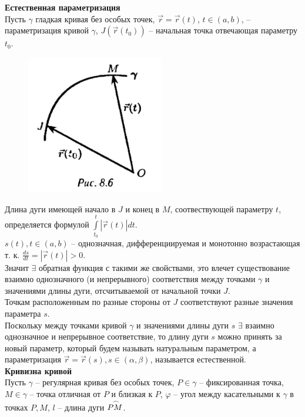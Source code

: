 \documentclass{report}
\begin{document}
\newpage
\noindent
\textbf{Естественная параметризация}\\
Пусть $\gamma$ гладкая кривая без особых точек, $\overrightarrow{r} = \overrightarrow{r}(t)$,
$t \in (a, b)$, -- параметризация кривой $\gamma$, $J(\overrightarrow{r}(t_0))$ -- начальная
точка отвечающая параметру $t_0$.\\

\begin{figure}[ht!]
\centering
\includegraphics[width=60mm]{curve5.png}
\end{figure}

\noindent
Длина дуги имеющей начало в $J$ и конец в $M$, соотвествующей параметру $t$, определяется 
формулой $\int\limits_{t_0}^{t} |\overrightarrow{r}(t)| dt$.\\
$s(t), t \in (a, b)$ -- однозначная, дифференциируемая и монотонно возрастающая т. к. 
$\frac{ds}{dt} = |\overrightarrow{r}(t)| > 0$.\\
Значит $\exists$ обратная функция с такими же свойствами, это влечет существование 
взаимно однозначного (и непрерывного) соответствия между точками $\gamma$ и значениями длины
дуги, отсчитываемой от начальной точки $J$.\\
Точкам расположенным по разные стороны от $J$ соответствуют разные значения параметра $s$.\\
Поскольку между точками кривой $\gamma$ и значениями длины дуги $s$ $\exists$ 
взаимно однозначное и непрерывное соответствие, то длину дуги $s$ можно принять за новый
параметр, который будем называть натуральным параметром, а параметризация 
$\overrightarrow{r} = \overrightarrow{r}(s), s \in (\alpha, \beta)$, называется естественной.\\

\noindent
\textbf{Кривизна кривой}\\
Пусть $\gamma$ -- регулярная кривая без особых точек, $P \in \gamma$ -- фиксированная точка, 
$M \in \gamma$ -- точка отличная от $P$ и близкая к $P$, $\varphi$ -- угол между касательными к
$\gamma$ в точках $P, M$, $l$ -- длина дуги $\buildrel\, \, \frown\over{PM}$.\\
\end{document}
